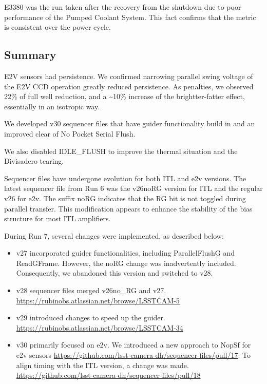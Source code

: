 E3380 was the run taken after the recovery from the shutdown due to poor performance of the Pumped Coolant System. This fact confirms that the metric is consistent over the power cycle.

\subsection{Summary}\label{summary}
E2V sensors had persistence. We confirmed narrowing parallel swing voltage of the E2V CCD operation greatly reduced persistence. As penalties, we observed 22\% of
full well reduction, and a \textasciitilde10\% increase of the
brightter-fatter effect, essentially in an isotropic way.

We developed v30 sequencer files that have guider functionality build in and an improved clear of No Pocket Serial Flush.

We also disabled IDLE\_FLUSH to improve the thermal situation and the Divisadero tearing.

Sequencer files have undergone evolution for both ITL and e2v versions.
The latest sequencer file from Run 6 was the
v26\label{norg}{noRG} version for ITL and the regular v26
for e2v. The suffix \label{norg}{noRG} indicates that the
RG bit is not toggled during parallel transfer. This modification
appears to enhance the stability of the bias structure for most ITL
amplifiers.

During Run 7, several changes were implemented, as described below:

\begin{itemize}
\tightlist
\item
  v27 incorporated guider functionalities, including ParallelFlushG and
  ReadGFrame. However, the noRG change was inadvertently included.
  Consequently, we abandoned this version and switched to v28.
\item
  v28 sequencer files merged v26\label{no_rg}{no\_RG} and
  v27. \url{https://rubinobs.atlassian.net/browse/LSSTCAM-5}
\item
  v29 introduced changes to speed up the guider.
  \url{https://rubinobs.atlassian.net/browse/LSSTCAM-34}
\item
  v30 primarily focused on e2v. We introduced a new approach to NopSf
  for e2v sensors
  \url{https://github.com/lsst-camera-dh/sequencer-files/pull/17}. To
  align timing with the ITL version, a change was made.
  \url{https://github.com/lsst-camera-dh/sequencer-files/pull/18}
\end{itemize}


